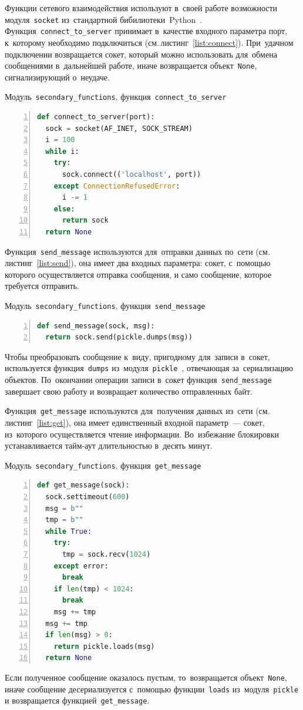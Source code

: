 Функции сетевого взаимодействия используют в~своей работе возможности модуля~\texttt{socket} из~стандартной бибилиотеки~Python~\autocite{socket}. Функция~\texttt{connect_to_server} принимает в~качестве входного параметра порт, к~которому необходимо подключиться (см.\,листинг~\ref{list:connect}). При~удачном подключении возвращается сокет, который можно использовать для~обмена сообщениями в~дальнейшей работе, иначе возвращается объект~\texttt{None}, сигнализирующий о~неудаче.
\begin{ListingEnv}\caption{Модуль~\texttt{secondary\_functions}, функция~\texttt{connect\_to\_server}}\label{list:connect}
\begin{lstlisting}[language=Python, numbers=left]
def connect_to_server(port):
  sock = socket(AF_INET, SOCK_STREAM)
  i = 100
  while i:
    try:
      sock.connect(('localhost', port))
    except ConnectionRefusedError:
      i -= 1
    else:
      return sock
  return None
\end{lstlisting}
\end{ListingEnv}

Функция~\texttt{send_message} используются для~отправки данных по~сети (см.\,листинг~\ref{list:send}), она имеет два входных параметра: сокет, с~помощью которого осуществляется отправка сообщения, и само сообщение, которое требуется отправить.
\begin{ListingEnv}\caption{Модуль~\texttt{secondary\_functions}, функция~\texttt{send\_message}}\label{list:send}
\begin{lstlisting}[language=Python, numbers=left]
def send_message(sock, msg):
  return sock.send(pickle.dumps(msg))
\end{lstlisting}
\end{ListingEnv}
Чтобы преобразовать сообщение к~виду, пригодному для~записи в~сокет, используется функция~\texttt{dumps} из~модуля~\texttt{pickle}~\autocite{pickle}, отвечающая за~сериализацию объектов. По~окончании операции записи в~сокет функция~\texttt{send_message} завершает свою работу и возвращает количество отправленных байт.

Функция~\texttt{get_message} используются для~получения данных из~сети (см.\,листинг~\ref{list:get}), она имеет единственный входной параметр~--- сокет, из~которого осуществляется чтение информации. Во~избежание блокировки устанавливается тайм-аут длительностью в~десять минут.
\begin{ListingEnv}\caption{Модуль~\texttt{secondary\_functions}, функция~\texttt{get\_message}}\label{list:get}
	\begin{lstlisting}[language=Python, numbers=left]
def get_message(sock):
  sock.settimeout(600)
  msg = b""
  tmp = b""
  while True:
    try:
      tmp = sock.recv(1024)
    except error:
      break
    if len(tmp) < 1024:
      break
    msg += tmp
  msg += tmp
  if len(msg) > 0:
    return pickle.loads(msg)
  return None
\end{lstlisting}
\end{ListingEnv}
Если полученное сообщение оказалось пустым, то~возвращается объект~\texttt{None}, иначе сообщение десериализуется с~помощью функции~\texttt{loads} из~модуля~\texttt{pickle} и возвращается функцией~\texttt{get_message}.

